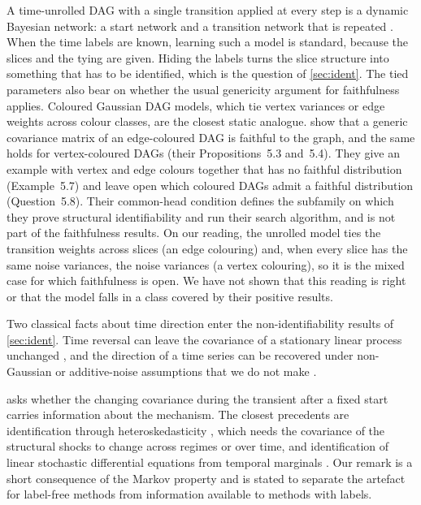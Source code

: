 \documentclass[pdflatex,sn-apa]{sn-jnl}
\theoremstyle{thmstyleone}
\theoremstyle{thmstylethree}
\theoremstyle{thmstyletwo}
\begin{document}
A time-unrolled DAG with a single transition applied at every step is a dynamic
Bayesian network: a start network and a transition network that is repeated
\citep{friedman1998learning}. When the time labels are known, learning such a
model is standard, because the slices and the tying are given. Hiding the labels
turns the slice structure into something that has to be identified, which is the
question of \cref{sec:ident}. The tied parameters also bear on whether the
usual genericity argument for faithfulness applies. Coloured Gaussian DAG
models, which tie vertex variances or edge weights across colour classes, are
the closest static analogue. \citet{boege2025colored} show that a generic
covariance matrix of an edge-coloured DAG is faithful to the graph, and the
same holds for vertex-coloured DAGs (their Propositions~5.3 and~5.4). They give
an example with vertex and edge colours together that has no faithful
distribution (Example~5.7) and leave open which coloured DAGs admit a faithful
distribution (Question~5.8). Their common-head condition defines the subfamily
on which they prove structural identifiability and run their search algorithm,
and is not part of the faithfulness results. On our reading, the unrolled model
ties the transition weights across slices (an edge colouring) and, when every
slice has the same noise variances, the noise variances (a vertex colouring),
so it is the mixed case for which faithfulness is open. We have not shown that
this reading is right or that the model falls in a class covered by their
positive results.

Two classical facts about time direction enter the non-identifiability results
of \cref{sec:ident}. Time reversal can leave the covariance of a stationary
linear process unchanged \citep{weiss1975time}, and the direction of a time
series can be recovered under non-Gaussian or additive-noise assumptions that we
do not make \citep{peters2009detecting}.

 asks whether the changing covariance during the transient
after a fixed start carries information about the mechanism. The closest
precedents are identification through heteroskedasticity
\citep{rigobon2003identification,lanne2008identifying,lewis2021identifying},
which needs the covariance of the structural shocks to change across regimes or
over time, and identification of linear stochastic differential equations from
temporal marginals \citep{wang2023generator,guan2026identifying}. Our remark is
a short consequence of the Markov property and is stated to separate the
artefact for label-free methods from information available to methods with
labels.
\end{document}
